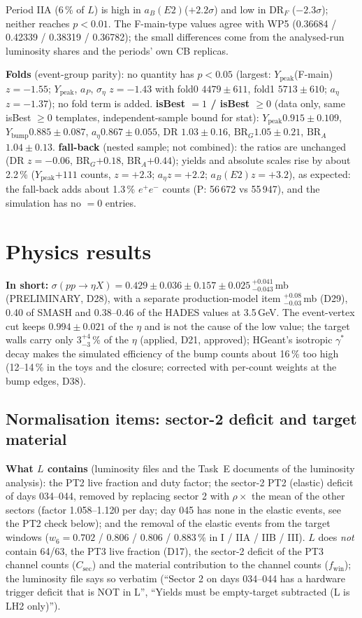 \documentclass[11pt,a4paper]{article}
\newcommand{\ee}{\ensuremath{e^{+}e^{-}}\xspace}
\newcommand{\code}[1]{\texttt{\detokenize{#1}}}
\newcommand{\aEta}{\ensuremath{a_\eta}\xspace}
\newcommand{\aP}{\ensuremath{a_P}\xspace}
\newcommand{\aB}{\ensuremath{a_B(E2)}\xspace}%
\newcommand{\Ybump}{\ensuremath{Y_{\mathrm{bump}}}\xspace}
\newcommand{\Ypeak}{\ensuremath{Y_{\mathrm{peak}}}\xspace}
\newcommand{\Csec}{\ensuremath{C_{\mathrm{sec}}}\xspace}
\newcommand{\fwin}{\ensuremath{f_{\mathrm{win}}}\xspace}
\newcommand{\BRG}{\ensuremath{\mathrm{BR}_G}\xspace}
\newcommand{\BRA}{\ensuremath{\mathrm{BR}_A}\xspace}
\newcommand{\sigeta}{\ensuremath{\sigma(pp\to\eta X)}\xspace}
\newcommand{\tipbox}[1]{\par\noindent\colorbox{blue!6}{\parbox{\dimexpr\linewidth-2\fboxsep\relax}{#1}}\par}
\newcommand{\inshort}[1]{\tipbox{\textbf{In short:} #1}}%
\begin{document}
Period IIA (6\,\% of $L$) is high in \aB ($+2.2\sigma$) and low in DR$_F$ ($-2.3\sigma$); neither reaches $p<0.01$. The F-main-type values
agree with WP5 (0.36684 / 0.42339 / 0.38319 / 0.36782); the small differences come from the analysed-run luminosity shares and the periods' own
CB replicas.

\textbf{Folds} (event-group parity): no quantity has $p<0.05$ (largest: \Ypeak(F-main) $z=-1.55$; \Ypeak, \aP, $\sigma_\eta$ $z=-1.43$ with
fold0 $4479\pm611$, fold1 $5713\pm610$; \aEta $z=-1.37$); no fold term is added. \textbf{isBest $=1$ / isBest $\ge0$} (data only, same isBest
$\ge0$ templates, independent-sample bound for stat): \Ypeak $0.915\pm0.109$, \Ybump $0.885\pm0.087$, \aEta $0.867\pm0.055$, DR $1.03\pm0.16$,
\BRG $1.05\pm0.21$, \BRA $1.04\pm0.13$. \textbf{\code{cor_ok} fall-back} (nested sample; not combined): the ratios are unchanged (DR $z=-0.06$,
\BRG $+0.18$, \BRA $+0.44$); yields and absolute scales rise by about 2.2\,\% (\Ypeak $+111$ counts, $z=+2.3$; \aEta $z=+2.2$; \aB $z=+3.2$), as
expected: the fall-back adds about 1.3\,\% \ee counts (P: 56\,672 vs 55\,947), and the simulation has no \code{cor_ok} $=0$ entries.

\section{Physics results}
\label{sec:phys}
\inshort{$\sigeta=0.429\pm0.036\pm0.157\pm0.025\,^{+0.041}_{-0.043}$\,mb (PRELIMINARY, D28), with a separate production-model item
$^{+0.08}_{-0.03}$\,mb (D29), 0.40 of SMASH and 0.38--0.46 of the HADES values at 3.5\,GeV. The event-vertex cut keeps $0.994\pm0.021$ of the $\eta$ and is not the cause of the low value; the target walls carry only $3^{+4}_{-3}$\,\% of the $\eta$ (applied, D21, approved); HGeant's isotropic $\gamma^*$ decay makes the simulated efficiency of the bump counts about 16\,\% too high (12--14\,\% in the toys and the closure; corrected with per-count weights at the bump edges, D38).}
\subsection{Normalisation items: sector-2 deficit and target material}
\label{sec:norm}
\textbf{What $L$ contains} (luminosity files and the Task~E documents of the luminosity analysis): the PT2 live fraction and duty factor;
the sector-2 PT2 (elastic) deficit of days 034--044, removed by replacing sector 2 with $\rho\times$ the mean of the other sectors
(factor 1.058--1.120 per day; day 045 has none in the elastic events, see the PT2 check below); and the removal of the elastic events from the target windows ($w_6=0.702$ / 0.806 / 0.806 / 0.883\,\% in
I / IIA / IIB / III). $L$ does \emph{not} contain 64/63, the PT3 live fraction (D17), the sector-2 deficit of the PT3 channel counts
(\Csec) and the material contribution to the channel counts (\fwin); the luminosity file says so verbatim (``Sector 2 on days 034--044 has
a hardware trigger deficit that is NOT in L'', ``Yields must be empty-target subtracted (L is LH2 only)'').
\end{document}
